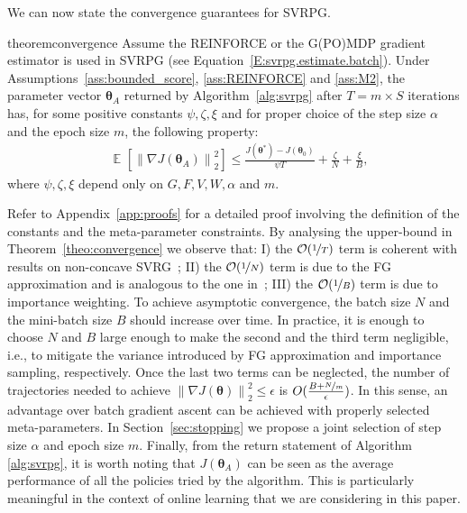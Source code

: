 \documentclass{article}
\makeatletter
\theoremstyle{remark}
\theoremstyle{definition}
\DeclareRobustCommand{\eg}{e.g.,\@\xspace}
\DeclareRobustCommand{\ie}{i.e.,\@\xspace}
\DeclareMathOperator*{\EV}{\mathbb{E}}
\newcommand{\EVV}[2][\ppvect \in \ppspace]{\EV_{#1}\left[{#2}\right]}
\newcommand{\norm}[2][\infty]{\left\|#2\right\|_{#1}}
\newcommand{\vtheta}{\boldsymbol{\theta}}
\newcommand{\gradJ}[1]{\nabla J(#1)}
\newcommand{\VARRF}{V}
\newcommand{\GRADLOG}{G}
\newcommand{\VARIS}{W}
\newcommand{\HESSLOG}{F}
\makeatother
\begin{document}
We can now state the convergence guarantees for SVRPG.
\begin{restatable}{theorem}{convergence}\label{theo:convergence}
Assume the REINFORCE or the G(PO)MDP gradient estimator is used in SVRPG (see Equation~\eqref{E:svrpg.estimate.batch}).
Under Assumptions~\ref{ass:bounded_score}, \ref{ass:REINFORCE} and \ref{ass:M2}, the parameter vector $\vtheta_A$ returned by Algorithm~\ref{alg:svrpg} after $T=m\times S$ iterations has, for some positive constants $\psi,\zeta, \xi$ and for proper choice of the step size $\alpha$ and the epoch size $m$, the following property:
\begin{align*}
	&\EVV[]
	{\norm[2]{\nabla J(\vtheta_A)}^2} 
		\leq
		\frac{J(\vtheta^*)-J(\vtheta_0)}{\psi T} +
		\frac{\zeta}{N}
		+\frac{\xi}{B},
\end{align*}
where $\psi,\zeta,\xi$ depend only on $\GRADLOG,\HESSLOG,\VARRF,\VARIS,\alpha$ and $m$.
\end{restatable}
Refer to Appendix~\ref{app:proofs} for a detailed proof involving the definition of the constants and the meta-parameter constraints.
By analysing the upper-bound in Theorem~\ref{theo:convergence} we observe that: I) the $\mathcal{O}(\nicefrac{1}{T})$ term is coherent with results on non-concave SVRG~\citep[\eg][]{reddi2016stochastic}; II) the $\mathcal{O}(\nicefrac{1}{N})$ term is due to the FG approximation and is analogous to the one in~\citep{harikandeh2015stopwasting}; III) the $\mathcal{O}(\nicefrac{1}{B})$ term is due to importance weighting.
To achieve asymptotic convergence, the batch size $N$ and the mini-batch size $B$ should increase over time. 
In practice, it is enough to choose $N$ and $B$ large enough to make the second and the third term negligible, \ie to mitigate the variance introduced by FG approximation and importance sampling, respectively.
Once the last two terms can be neglected, the number of trajectories needed to achieve $\norm[2]{\gradJ{\vtheta}}^2\leq\epsilon$ is $O(\frac{B+\nicefrac{N}{m}}{\epsilon})$. In this sense, an advantage over batch gradient ascent can be achieved with properly selected meta-parameters. In Section~\ref{sec:stopping} we propose a joint selection of step size $\alpha$ and epoch size $m$.
Finally, from the return statement of Algorithm \ref{alg:svrpg}, it is worth noting that $J(\vtheta_A)$ can be seen as the average performance of all the policies tried by the algorithm. This is particularly meaningful in the context of online learning that we are considering in this paper.
\end{document}

